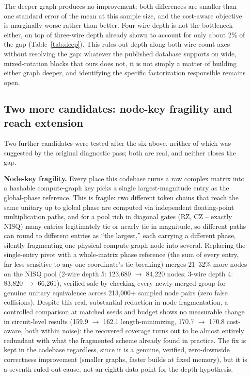 \documentclass[11pt]{article}
\begin{document}
The deeper graph produces no improvement: both differences are smaller
than one standard error of the mean at this sample size, and the
cost-aware objective is marginally worse rather than better. Four-wire
depth is not the bottleneck either, on top of three-wire depth already
shown to account for only about 2\% of the gap (Table~\ref{tab:deep}).
This rules out depth along both wire-count axes without resolving the
gap: whatever the published database supports on wide, mixed-rotation
blocks that ours does not, it is not simply a matter of building either
graph deeper, and identifying the specific factorization responsible
remains open.

\subsection{Two more candidates: node-key fragility and reach extension}
\label{sec:more-candidates}

Two further candidates were tested after the six above, neither of which
was suggested by the original diagnostic pass; both are real, and neither
closes the gap.

\textbf{Node-key fragility.} Every place this codebase turns a raw complex
matrix into a hashable compute-graph key picks a single largest-magnitude
entry as the global-phase reference. This is fragile: two different token
chains that reach the same unitary up to global phase are computed via
independent floating-point multiplication paths, and for a pool rich in
diagonal gates (RZ, CZ -- exactly NISQ) many entries legitimately tie or
nearly tie in magnitude, so different paths can round to different entries
as ``the largest,'' each carrying a different phase, silently fragmenting
one physical compute-graph node into several. Replacing the single-entry
pivot with a whole-matrix phase reference (the sum of every entry, far
less sensitive to any one coordinate's tie-breaking) merges 21--32\% more
nodes on the NISQ pool (2-wire depth 5: 123{,}689 $\to$ 84{,}220 nodes;
3-wire depth 4: 83{,}820 $\to$ 66{,}261), verified safe by checking every
newly-merged group for genuine unitary equivalence across 213{,}000+
sampled node pairs (zero false collisions). Despite this real, substantial
reduction in node fragmentation, a controlled comparison at matched
seeds and budget shows no measurable change in circuit-level results
(159.9 $\to$ 162.1 length-minimizing, 170.7 $\to$ 170.8 cost-aware,
both within noise): the recovered coverage turns out to be almost
entirely redundant with what the fragmented scheme already found in
practice. The fix is kept in the codebase regardless, since it is a
genuine, verified, zero-downside correctness improvement (smaller graphs,
faster builds at fixed memory), but it is a seventh ruled-out cause, not
an eighth data point for the depth hypothesis.
\end{document}
